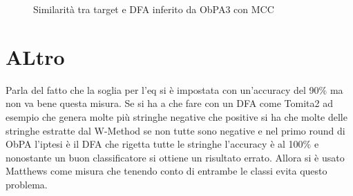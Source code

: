\begin{figure}
\centering
{}

\caption*{Similarità tra target e DFA inferito da ObPA3 con MCC}
   \label{fig:obpa3tommat}
\end{figure}






\section{ALtro}
Parla del fatto che la soglia per l'eq si è impostata con un'accuracy del 90$\%$ ma non va bene questa misura. Se si ha a che fare con un \ac{DFA} come Tomita2 ad esempio che genera molte più stringhe negative che positive si ha che molte delle stringhe estratte dal W-Method se non tutte sono negative e nel primo round di \ac{ObPA} l'iptesi è il DFA che rigetta tutte le stringhe l'accuracy è al 100$\%$ e nonostante un buon classificatore si ottiene un risultato errato. Allora si è usato Matthews come misura che tenendo conto di entrambe le classi evita questo problema.

